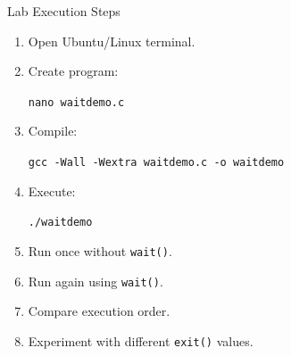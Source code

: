 \documentclass[aspectratio=169]{beamer}
\begin{document}
\begin{frame}{Lab Execution Steps}

\begin{enumerate}

    \item Open Ubuntu/Linux terminal.

    \item Create program:
    \begin{center}
    \texttt{nano waitdemo.c}
    \end{center}

    \item Compile:
    \begin{center}
    \texttt{gcc -Wall -Wextra waitdemo.c -o waitdemo}
    \end{center}

    \item Execute:
    \begin{center}
    \texttt{./waitdemo}
    \end{center}

    \item Run once without \texttt{wait()}.

    \item Run again using \texttt{wait()}.

    \item Compare execution order.

    \item Experiment with different \texttt{exit()} values.

\end{enumerate}

\end{frame}
\end{document}
